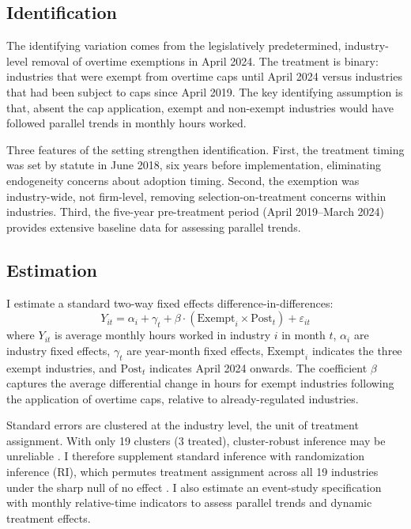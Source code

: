 \documentclass[12pt]{article}
\begin{document}
\subsection{Identification}

The identifying variation comes from the legislatively predetermined, industry-level removal of overtime exemptions in April 2024. The treatment is binary: industries that were exempt from overtime caps until April 2024 versus industries that had been subject to caps since April 2019. The key identifying assumption is that, absent the cap application, exempt and non-exempt industries would have followed parallel trends in monthly hours worked.

Three features of the setting strengthen identification. First, the treatment timing was set by statute in June 2018, six years before implementation, eliminating endogeneity concerns about adoption timing. Second, the exemption was industry-wide, not firm-level, removing selection-on-treatment concerns within industries. Third, the five-year pre-treatment period (April 2019--March 2024) provides extensive baseline data for assessing parallel trends.

\subsection{Estimation}

I estimate a standard two-way fixed effects difference-in-differences:
\begin{equation}
Y_{it} = \alpha_i + \gamma_t + \beta \cdot (\text{Exempt}_i \times \text{Post}_t) + \varepsilon_{it}
\label{eq:did}
\end{equation}
where $Y_{it}$ is average monthly hours worked in industry $i$ in month $t$, $\alpha_i$ are industry fixed effects, $\gamma_t$ are year-month fixed effects, $\text{Exempt}_i$ indicates the three exempt industries, and $\text{Post}_t$ indicates April 2024 onwards. The coefficient $\beta$ captures the average differential change in hours for exempt industries following the application of overtime caps, relative to already-regulated industries.

Standard errors are clustered at the industry level, the unit of treatment assignment. With only 19 clusters (3 treated), cluster-robust inference may be unreliable \citep{cameron2008}. I therefore supplement standard inference with randomization inference (RI), which permutes treatment assignment across all 19 industries under the sharp null of no effect \citep{fisher1935, young2019}. I also estimate an event-study specification with monthly relative-time indicators to assess parallel trends and dynamic treatment effects.
\end{document}
